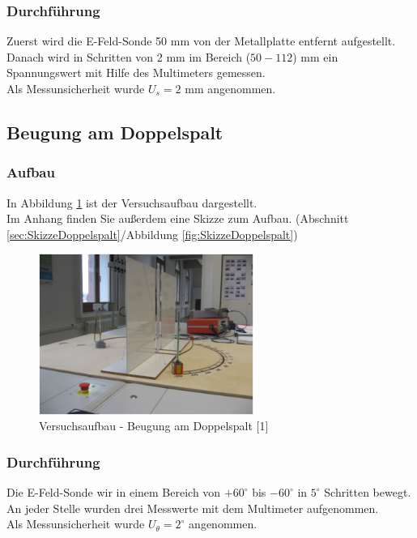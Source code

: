\documentclass[a4paper]{scrartcl}
\numberwithin{equation}{subsection}
\begin{document}
\subsubsection{Durchführung}
Zuerst wird die E-Feld-Sonde 50 mm von der Metallplatte entfernt aufgestellt. Danach wird in Schritten von 2 mm im Bereich ($50-112$) mm ein Spannungswert mit Hilfe des Multimeters gemessen.\\
Als Messunsicherheit wurde $U_s = 2$ mm angenommen.

\subsection{Beugung am Doppelspalt}
\subsubsection{Aufbau}
In Abbildung \ref{fig:AufbauDoppelspalt} ist der Versuchsaufbau dargestellt.\\
Im Anhang finden Sie außerdem eine Skizze zum Aufbau. (Abschnitt \ref{sec:SkizzeDoppelspalt}/Abbildung \ref{fig:SkizzeDoppelspalt})

\begin{figure}[H]
\includegraphics[width=7cm]{Aufbau_Doppelspalt}
\centering
\caption{Versuchsaufbau - Beugung am Doppelspalt [1]}
\centering
\label{fig:AufbauDoppelspalt}
\end{figure}

\subsubsection{Durchführung}
Die E-Feld-Sonde wir in einem Bereich von $+60 ^\circ$ bis $-60 ^\circ$ in $5 ^\circ$ Schritten bewegt. An jeder Stelle wurden drei Messwerte mit dem Multimeter aufgenommen.\\
Als Messunsicherheit wurde $U_\theta = 2 ^\circ$ angenommen.
\newpage
\end{document}
